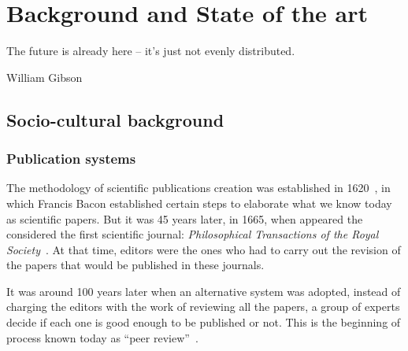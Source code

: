 \chapter{Background and State of the art}

\begin{FraseCelebre}
  \begin{Frase}
    The future is already here – it's just not evenly distributed.
  \end{Frase}
  \begin{Fuente}
    William Gibson
  \end{Fuente}
\end{FraseCelebre}


\section{Socio-cultural background}
\label{scb}
\subsection{Publication systems}
\label{scb:ps}
The methodology of scientific publications creation was established in
1620~\cite{bacon1878novum}, in which Francis Bacon established certain steps to
elaborate what we know today as scientific papers. But it was 45 years later, in
1665, when appeared the considered the first scientific journal:
\emph{Philosophical Transactions of the Royal
  Society}~\cite{kronick1976history}. At that time, editors were the ones
who had to carry out the revision of the papers that would be published in these
journals.


It was around 100 years later when an alternative system was adopted, instead of
charging the editors with the work of reviewing all the papers, a group of
experts decide if each one is good enough to be published or not. This is the
beginning of process known today as ``peer review''~\cite{spier2002history}.

